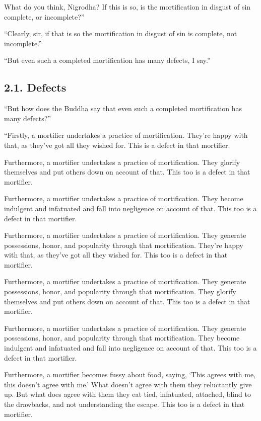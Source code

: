 \documentclass[12pt,openany]{book}%
\begin{document}
What do you think, Nigrodha? If this is so, is the mortification in disgust of sin complete, or incomplete?” 

“Clearly, sir, if that is so the mortification in disgust of sin is complete, not incomplete.” 

“But even such a completed mortification has many defects, I say.” 

\subsection*{2.1. Defects }

“But how does the Buddha say that even such a completed mortification has many defects?” 

“Firstly, a mortifier undertakes a practice of mortification. They’re happy with that, as they’ve got all they wished for. This is a defect in that mortifier. 

Furthermore, a mortifier undertakes a practice of mortification. They glorify themselves and put others down on account of that. This too is a defect in that mortifier. 

Furthermore, a mortifier undertakes a practice of mortification. They become indulgent and infatuated and fall into negligence on account of that. This too is a defect in that mortifier. 

Furthermore, a mortifier undertakes a practice of mortification. They generate possessions, honor, and popularity through that mortification. They’re happy with that, as they’ve got all they wished for. This too is a defect in that mortifier. 

Furthermore, a mortifier undertakes a practice of mortification. They generate possessions, honor, and popularity through that mortification. They glorify themselves and put others down on account of that. This too is a defect in that mortifier. 

Furthermore, a mortifier undertakes a practice of mortification. They generate possessions, honor, and popularity through that mortification. They become indulgent and infatuated and fall into negligence on account of that. This too is a defect in that mortifier. 

Furthermore, a mortifier becomes fussy about food, saying, ‘This agrees with me, this doesn’t agree with me.’ What doesn’t agree with them they reluctantly give up. But what does agree with them they eat tied, infatuated, attached, blind to the drawbacks, and not understanding the escape. This too is a defect in that mortifier. 
\end{document}
